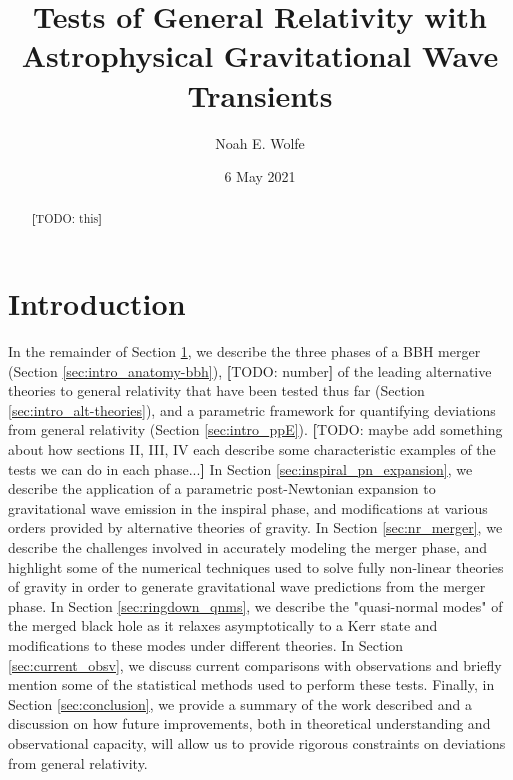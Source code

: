 \documentclass[aps,prd,twocolumn,floatfix,preprintnumbers,altaffilletter,superscriptaddress]{revtex4-1}
\newcommand{\TODO}[1]{\textbf{[}{\color{red}TODO: }{\color{blue}#1}\textbf{]}}
\begin{document}
\title{Tests of General Relativity with Astrophysical Gravitational Wave Transients}
\author{Noah E. Wolfe}
\date{6 May 2021}

\begin{abstract}
    \TODO{this}
\end{abstract}

\maketitle

\section{Introduction} \label{sec:intro}




In the remainder of Section \ref{sec:intro}, we describe the three phases of a BBH merger (Section \ref{sec:intro_anatomy-bbh}), \TODO{number} of the leading alternative theories to general relativity that have been tested thus far (Section \ref{sec:intro_alt-theories}), and a parametric framework for quantifying deviations from general relativity (Section \ref{sec:intro_ppE}). \TODO{maybe add something about how sections II, III, IV each describe some characteristic examples of the tests we can do in each phase...} In Section \ref{sec:inspiral_pn_expansion}, we describe the application of a parametric post-Newtonian expansion to gravitational wave emission in the inspiral phase, and modifications at various orders provided by alternative theories of gravity. In Section \ref{sec:nr_merger}, we describe the challenges involved in accurately modeling the merger phase, and highlight some of the numerical techniques used to solve fully non-linear theories of gravity in order to generate gravitational wave predictions from the merger phase. In Section \ref{sec:ringdown_qnms}, we describe the "quasi-normal modes" of the merged black hole as it relaxes asymptotically to a Kerr state and modifications to these modes under different theories. In Section \ref{sec:current_obsv}, we discuss current comparisons with observations and briefly mention some of the statistical methods used to perform these tests. Finally, in Section \ref{sec:conclusion}, we provide a summary of the work described and a discussion on how future improvements, both in theoretical understanding and observational capacity, will allow us to provide rigorous constraints on deviations from general relativity. \cite{2020arXiv201014529T}
\end{document}
